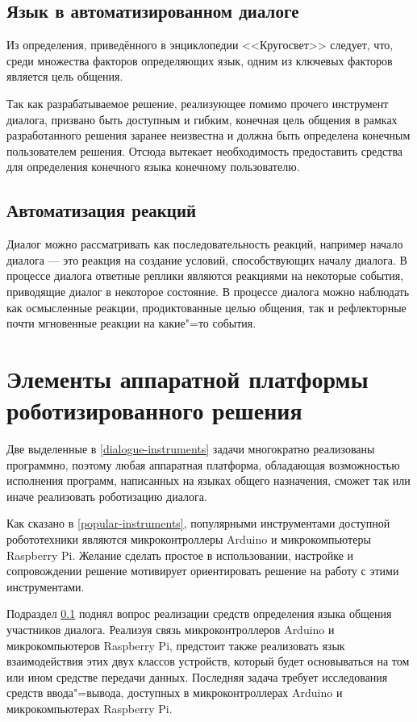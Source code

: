 \subsection{Язык в автоматизированном диалоге}\label{language-auto}
Из определения, приведённого в энциклопедии <<Кругосвет>> \cite{lang-krugosvet} следует, что, среди множества факторов определяющих язык, одним из ключевых факторов является цель общения. 

Так как разрабатываемое решение, реализующее помимо прочего инструмент диалога, призвано быть доступным и гибким, конечная цель общения в рамках разработанного решения заранее неизвестна и должна быть определена конечным пользователем решения. Отсюда вытекает необходимость предоставить средства для определения конечного языка конечному пользователю. 





\subsection{Автоматизация реакций}
Диалог можно рассматривать как последовательность реакций, например начало диалога --- это реакция на создание условий, способствующих началу диалога. В процессе диалога ответные реплики являются реакциями на некоторые события, приводящие диалог в некоторое состояние. В процессе диалога можно наблюдать как осмысленные реакции, продиктованные целью общения, так и рефлекторные почти мгновенные реакции на какие"=то события.



\section{Элементы аппаратной платформы роботизированного решения} \label{apparat-platform}

Две выделенные в \ref{dialogue-instruments} задачи многократно реализованы программно, поэтому любая аппаратная платформа, обладающая возможностью исполнения программ, написанных на языках общего назначения, сможет так или иначе реализовать роботизацию диалога.  

Как сказано в \ref{popular-instruments}, популярными инструментами доступной робототехники являются микроконтроллеры Arduino и микрокомпьютеры Raspberry Pi. Желание сделать простое в использовании, настройке и сопровождении решение мотивирует ориентировать решение на работу с этими инструментами. 


Подраздел \ref{language-auto} поднял вопрос реализации средств определения языка общения участников диалога. Реализуя связь микроконтроллеров
Arduino и микрокомпьютеров Raspberry Pi, предстоит также реализовать язык взаимодействия этих двух классов устройств, который будет основываться на том или ином средстве передачи данных. Последняя задача требует исследования средств ввода"=вывода, доступных в микроконтроллерах Arduino и микрокомпьютерах Raspberry Pi.

